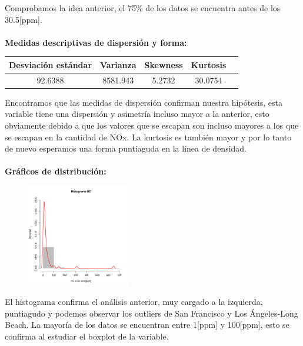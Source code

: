 \documentclass[11pt]{article}
\begin{document}
Comprobamos la idea anterior, el 75\% de los datos se encuentra antes de los 30.5[ppm].
\\
\\
\textbf{Medidas descriptivas de dispersión y forma:}

\begin{center}
\begin{tabular}{|c|c|c|c|c|}
    \hline
    Desviación estándar  & Varianza & Skewness & Kurtosis\\ \hline
    92.6388 & 8581.943 & 5.2732 & 30.0754\\
    \hline
\end{tabular}
\end{center}

Encontramos que las medidas de dispersión confirman nuestra hipótesis, esta variable tiene una dispersión y asimetría incluso mayor a la anterior, esto obviamente debido a que los valores que se escapan son incluso mayores a los que se escapan en la cantidad de NOx. La kurtosis es también mayor y por lo tanto de nuevo esperamos una forma puntiaguda en la línea de densidad.
\\
\\
\textbf{Gráficos de distribución:}
\\

\begin{figure}
    \centering
    \includegraphics[width = 0.4\textwidth]{histhc}
\end{figure}

El histograma confirma el análisis anterior, muy cargado a la izquierda, puntiagudo y podemos observar los outliers de San Francisco y Los Ángeles-Long Beach. La mayoría de los datos se encuentran entre 1[ppm] y 100[ppm], esto se confirma al estudiar el boxplot de la variable.
\\
\\
\\
\\
\\
\\
\\
\\
\\
\\
\end{document}
